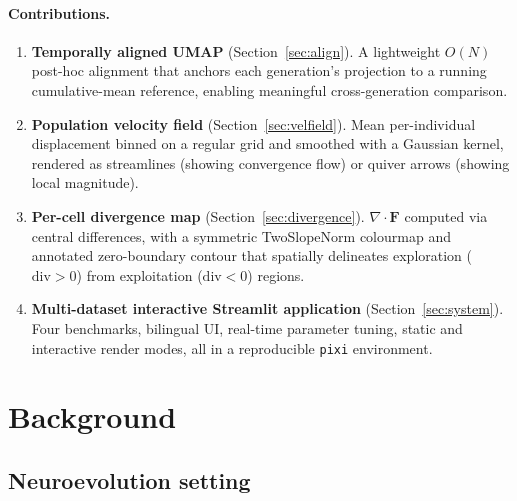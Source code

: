 \documentclass{article}
\begin{document}
\paragraph{Contributions.}
\begin{enumerate}
  \item \textbf{Temporally aligned UMAP} (Section~\ref{sec:align}).
        A lightweight $O(N)$ post-hoc alignment that anchors each generation's
        projection to a running cumulative-mean reference, enabling
        meaningful cross-generation comparison.

  \item \textbf{Population velocity field} (Section~\ref{sec:velfield}).
        Mean per-individual displacement binned on a regular grid and
        smoothed with a Gaussian kernel, rendered as streamlines (showing
        convergence flow) or quiver arrows (showing local magnitude).

  \item \textbf{Per-cell divergence map} (Section~\ref{sec:divergence}).
        $\nabla \cdot \mathbf{F}$ computed via central differences, with a
        symmetric TwoSlopeNorm colourmap and annotated zero-boundary contour
        that spatially delineates exploration ($\text{div}>0$) from
        exploitation ($\text{div}<0$) regions.

  \item \textbf{Multi-dataset interactive Streamlit application}
        (Section~\ref{sec:system}).
        Four benchmarks, bilingual UI, real-time parameter tuning, static
        and interactive render modes, all in a reproducible \texttt{pixi}
        environment.
\end{enumerate}


\section{Background}
\label{sec:background}

\subsection{Neuroevolution setting}
\end{document}
